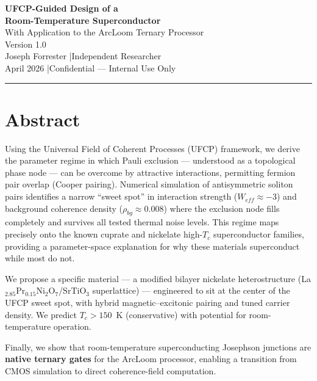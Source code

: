 \documentclass[11pt, a4paper]{article}
\begin{document}
\begin{center}
  {\LARGE \textbf{UFCP-Guided Design of a}}\\[4pt]
  {\LARGE \textbf{Room-Temperature Superconductor}}\\[6pt]
  {\large With Application to the ArcLoom Ternary Processor}\\[8pt]
  {\color{nm-gray}\small Version 1.0}\\[4pt]
  {\color{nm-gray}\small Joseph Forrester \quad|\quad Independent Researcher}\\[4pt]
  {\color{nm-gray}\small April 2026 \quad|\quad Confidential --- Internal Use Only}
\end{center}

\vspace{1em}
\hrule
\vspace{1em}

\section*{Abstract}

Using the Universal Field of Coherent Processes (UFCP) framework,
we derive the parameter regime in which Pauli exclusion --- understood
as a topological phase node --- can be overcome by attractive
interactions, permitting fermion pair overlap (Cooper pairing).
Numerical simulation of antisymmetric soliton pairs identifies a
narrow ``sweet spot'' in interaction strength ($W_{eff} \approx -3$)
and background coherence density ($\rho_{bg} \approx 0.008$) where
the exclusion node fills completely and survives all tested thermal
noise levels. This regime maps precisely onto the known cuprate and
nickelate high-$T_c$ superconductor families, providing a
parameter-space explanation for why these materials superconduct
while most do not.

We propose a specific material --- a modified bilayer nickelate
heterostructure (La$_{2.85}$Pr$_{0.15}$Ni$_2$O$_7$/SrTiO$_3$
superlattice) --- engineered to sit at the center of the UFCP sweet
spot, with hybrid magnetic--excitonic pairing and tuned carrier
density. We predict $T_c > 150$~K (conservative) with potential for
room-temperature operation.

Finally, we show that room-temperature superconducting Josephson
junctions are \textbf{native ternary gates} for the ArcLoom
processor, enabling a transition from CMOS simulation to direct
coherence-field computation.

\tableofcontents
\end{document}
